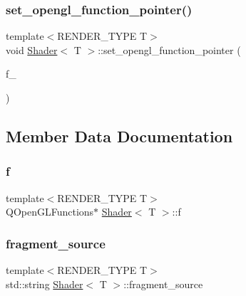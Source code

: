 \subsubsection{\texorpdfstring{set\+\_\+opengl\+\_\+function\+\_\+pointer()}{set\_opengl\_function\_pointer()}}
{\footnotesize\ttfamily template$<$R\+E\+N\+D\+E\+R\+\_\+\+T\+Y\+PE T$>$ \\
void \mbox{\hyperlink{classShader}{Shader}}$<$ T $>$\+::set\+\_\+opengl\+\_\+function\+\_\+pointer (\begin{DoxyParamCaption}\item[{Q\+Open\+G\+L\+Functions $\ast$}]{f\+\_\+ }\end{DoxyParamCaption})\hspace{0.3cm}{\ttfamily [inline]}}



\subsection{Member Data Documentation}
\mbox{\label{classShader_a49f049def31a2fa9d76c7dad3a9777f3}} 
\subsubsection{\texorpdfstring{f}{f}}
{\footnotesize\ttfamily template$<$R\+E\+N\+D\+E\+R\+\_\+\+T\+Y\+PE T$>$ \\
Q\+Open\+G\+L\+Functions$\ast$ \mbox{\hyperlink{classShader}{Shader}}$<$ T $>$\+::f\hspace{0.3cm}{\ttfamily [protected]}}

\mbox{\label{classShader_afe4fa217dd3f5d201b6a5a4c7fd784be}} 
\subsubsection{\texorpdfstring{fragment\+\_\+source}{fragment\_source}}
{\footnotesize\ttfamily template$<$R\+E\+N\+D\+E\+R\+\_\+\+T\+Y\+PE T$>$ \\
std\+::string \mbox{\hyperlink{classShader}{Shader}}$<$ T $>$\+::fragment\+\_\+source\hspace{0.3cm}{\ttfamily [protected]}}

\mbox{\label{classShader_add247d4b8be858eadee1560507ee7118}} 
